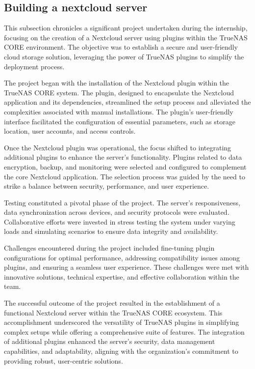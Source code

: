 \subsection{Building a nextcloud server}
This subsection chronicles a significant project undertaken during the internship, focusing on the creation of a Nextcloud server using plugins within the TrueNAS CORE environment. The objective was to establish a secure and user-friendly cloud storage solution, leveraging the power of TrueNAS plugins to simplify the deployment process.

The project began with the installation of the Nextcloud plugin within the TrueNAS CORE system. The plugin, designed to encapsulate the Nextcloud application and its dependencies, streamlined the setup process and alleviated the complexities associated with manual installations. The plugin's user-friendly interface facilitated the configuration of essential parameters, such as storage location, user accounts, and access controls.

Once the Nextcloud plugin was operational, the focus shifted to integrating additional plugins to enhance the server's functionality. Plugins related to data encryption, backup, and monitoring were selected and configured to complement the core Nextcloud application. The selection process was guided by the need to strike a balance between security, performance, and user experience.

Testing constituted a pivotal phase of the project. The server's responsiveness, data synchronization across devices, and security protocols were evaluated. Collaborative efforts were invested in stress testing the system under varying loads and simulating scenarios to ensure data integrity and availability.

Challenges encountered during the project included fine-tuning plugin configurations for optimal performance, addressing compatibility issues among plugins, and ensuring a seamless user experience. These challenges were met with innovative solutions, technical expertise, and effective collaboration within the team.

The successful outcome of the project resulted in the establishment of a functional Nextcloud server within the TrueNAS CORE ecosystem. This accomplishment underscored the versatility of TrueNAS plugins in simplifying complex setups while offering a comprehensive suite of features. The integration of additional plugins enhanced the server's security, data management capabilities, and adaptability, aligning with the organization's commitment to providing robust, user-centric solutions.
